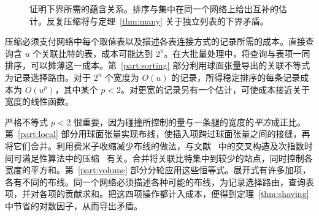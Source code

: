 \begin{figure}[!htbp]
\centering
{}
\caption{证明下界所需的蕴含关系。排序与集中在同一个网络上给出互补的估计。反复压缩将与定理~\ref{thm:many} 关于独立列表的下界矛盾。}\label{fig:org}
\end{figure}

压缩必须支付网络中每个取值表以及描述各表连接方式的记录所需的成本。直接查询含 \(u\) 个关联比特的表，成本可能达到 \(2^u\)。在大批量处理中，将查询与表项一同排序，可以摊薄这一成本。第~\ref{part:sorting} 部分利用球面张量导出的关联不等式为记录选择路由。对于 \(2^u\) 个宽度为 \(O(u)\) 的记录，所得稳定排序的每条记录成本为 \(O(u^p)\)，其中某个 \(p<2\)。对更宽的记录另有一个估计，可使成本接近关于宽度的线性函数。

严格不等式 \(p<2\) 很重要，因为碰撞所控制的量与一条腿的宽度的\emph{平方}成正比。第~\ref{part:local} 部分用球面张量实现布线，使插入项跨过球面张量之间的接缝，再将它们合并。利用费米子收缩减少布线的做法，与文献~\cite{Khoruzhii,oaG} 中的交叉构造及次指数时间可满足性算法中的压缩~\cite{falseeth,Anthropic} 有关。合并将关联比特集中到较少的站点，同时控制各宽度的平方和。第~\ref{part:volume} 部分分轮应用这些恒等式。展开式有许多加项，各有不同的布线。同一个网络必须描述各种可能的布线，为记录选择路由，查询表项，并对各项的贡献求和。把这四项操作都计入成本，便得到定理~\ref{thm:shaving} 中节省的对数因子，从而导出矛盾。


